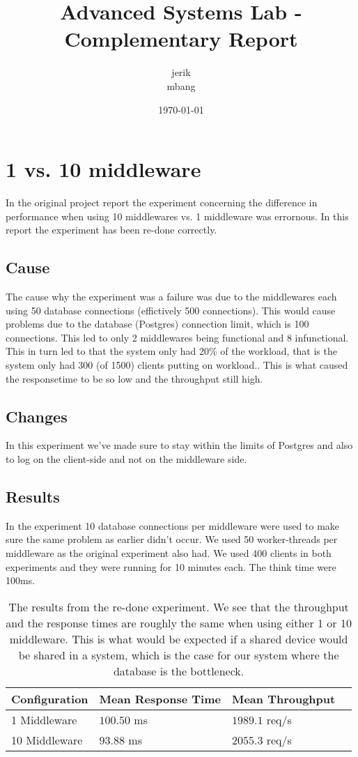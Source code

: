 \documentclass[a4paper, 11pt]{article}
\title{Advanced Systems Lab - Complementary Report}
\author{jerik\\mbang\\}
\date{\today}
\begin{document}
\maketitle

\section{1 vs. 10 middleware}
In the original project report the experiment concerning the difference in performance when using 10 middlewares vs. 1 middleware was errornous. In this report the experiment has been re-done correctly.

\subsection{Cause}
The cause why the experiment was a failure was due to the middlewares each using 50 database connections (effictively 500 connections). 
This would cause problems due to the database (Postgres) connection limit, which is 100 connections. 
This led to only 2 middlewares being functional and 8 infunctional. This in turn led to that the system only had 20\% of the workload, that is the system only had 300 (of 1500) clients putting on workload.. This is what caused the responsetime to be so low and the throughput still high.\\

\subsection{Changes}
In this experiment we've made sure to stay within the limits of Postgres and also to log on the client-side and not on the middleware side.

\subsection{Results}
In the experiment 10 database connections per middleware were used to make sure the same problem as earlier didn't occur. We used 50 worker-threads per middleware as the original experiment also had. We used 400 clients in both experiments and they were running for 10 minutes each. The think time were 100ms.
\begin{table}[!htbp]
\centering
    \begin{tabular}{|l|l|l|l|}
    \hline
    Configuration & Mean Response Time & Mean Throughput\\ \hline
    1 Middleware  & $100.50$ ms       	&   $1989.1$ req/s  \\ \hline
    10 Middleware & $93.88$  ms       	&   $2055.3$ req/s  \\ \hline
    \end{tabular}
    \label{table}
    \caption{The results from the re-done experiment. We see that the throughput and the response times are roughly the same when using either 1 or 10 middleware. This is what would be expected if a shared device would be shared in a system, which is the case for our system where the database is the bottleneck.}
\end{table}
\FloatBarrier %
\end{document}
